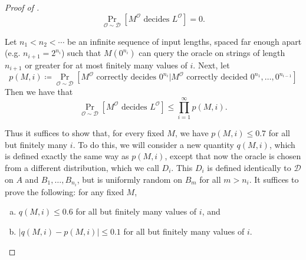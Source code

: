 \documentclass[11pt]{article}%
\begin{document}
\begin{proof}[Proof of ]
\[
\Pr_{\mathcal{O}\sim\mathcal{D}}\left[M^\mathcal{O} \text{ decides } L^\mathcal{O}\right]=0.
\]

Let $n_1<n_2<\cdots$ be an infinite sequence of input lengths, spaced far enough apart (e.g. $n_{i+1}=2^{n_i}$) such that $M\left(0^{n_i}\right)$ can query the oracle on strings of length $n_{i+1}$ or greater for at most finitely many values of $i$. Next, let
\[
p(M,i)\coloneqq\Pr_{\mathcal{O}\sim\mathcal{D}}\left[M^\mathcal{O} \text{ correctly decides } 0^{n_i}|M^\mathcal{O} \text{ correctly decided }0^{n_1},\dots,0^{n_{i-1}}\right]
\]
Then we have that
\[
\Pr_{\mathcal{O}\sim\mathcal{D}}\left[M^\mathcal{O}\text{ decides }L^\mathcal{O}\right]\leq\prod_{i=1}^\infty p(M,i).
\]

\noindent Thus it suffices to show that, for every fixed $M$, we have $p(M,i)\leq 0.7$ for all but finitely many $i$. To do this, we will consider a new quantity $q(M,i)$, which is defined exactly the same way as $p(M,i)$, except that now the oracle is chosen from a different distribution, which we call $D_i$. This $D_i$ is defined identically to $\mathcal{D}$ on $A$ and $B_1, \ldots, B_{n_i}$, but is uniformly random on $B_m$ for all $m > n_i$. It suffices to prove the following: for any fixed $M$,
\begin{enumerate}[(a)]
    \item $q(M,i)\leq 0.6$ for all but finitely many values of $i$, and
    \item $|q(M,i)-p(M,i)|\leq 0.1$ for all but finitely many values of $i$.
\end{enumerate}


\end{proof}
\end{document}
